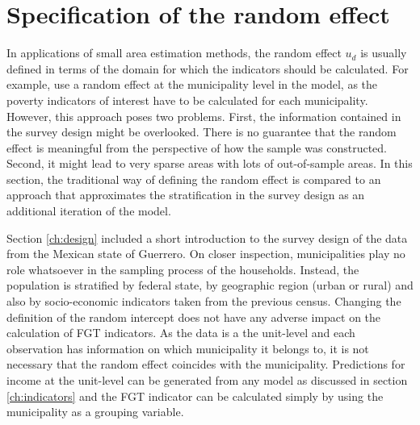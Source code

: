 \section{Specification of the random effect}
\label{ch:raneff}
In applications of small area estimation methods, the random effect $u_d$ is usually defined in terms of the domain for which the indicators should be calculated.
For example, \cite{rojas_perilla_data_2020} use a random effect at the municipality level in the model, as the poverty indicators of interest have to be calculated for each municipality.
However, this approach poses two problems.
First, the information contained in the survey design might be overlooked.
There is no guarantee that the random effect is meaningful from the perspective of how the sample was constructed.
Second, it might lead to very sparse areas with lots of out-of-sample areas.
In this section, the traditional way of defining the random effect is compared to an approach that approximates the stratification in the survey design as an additional iteration of the model.

Section \ref{ch:design} included a short introduction to the survey design of the data from the Mexican state of Guerrero.
On closer inspection, municipalities play no role whatsoever in the sampling process of the households.
Instead, the population is stratified by federal state, by geographic region (urban or rural) and also by socio-economic indicators taken from the previous census.
Changing the definition of the random intercept does not have any adverse impact on the calculation of FGT indicators.
As the data is a the unit-level and each observation has information on which municipality it belongs to, it is not necessary that the random effect coincides with the municipality.
Predictions for income at the unit-level can be generated from any model as discussed in section \ref{ch:indicators} and the FGT indicator can be calculated simply by using the municipality as a grouping variable.

